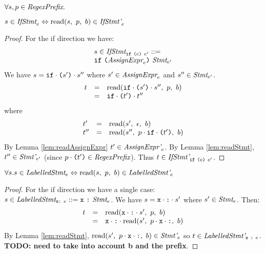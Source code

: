 \documentclass[preprint,10pt]{sigplanconf}
\begin{document}
\begin{lemma}\mbox{}
  
  \( \forall s, p \in \textit{RegexPrefix}. \)

  \( s \in \textit{IfStmt}_{e} \Leftrightarrow 
  \textrm{read}(s,~p,~b) \in \textit{IfStmt'}_{e} \)
\end{lemma}
\begin{proof}
  For the if direction we have:
  \[
  \begin{array}{lcl}
    s \in
    \textit{IfStmt}_{\texttt{if}~\texttt{(}e\texttt{)}~e'} 
    ::= 
    \\
    \texttt{if}~ \texttt{(}\textit{AssignExpr}_{e}\texttt{)}~
    \textit{Stmt}_{e'}
  \end{array}
  \]
  We have \( s = \texttt{if}\cdot \texttt{(}s'\texttt{)}\cdot s'' \) where \( s' \in
  \textit{AssignExpr}_{e} \) and \( s'' \in \textit{Stmt}_{e'} \).
  \[
  \begin{array}{rcl}
    t &=& \textrm{read}(
      \texttt{if}\cdot \texttt{(}s'\texttt{)}\cdot s'' 
    ,~p,~b)
    \\
    &=& \texttt{if} \cdot \texttt{(}t'\texttt{)} \cdot t'' 
  \end{array}
  \]
  where 
  \[ 
  \begin{array}{lcl}
    t' &=& \textrm{read}(s',~\epsilon,~b)
    \\
    t'' &=& \textrm{read}(s'',~
      p \cdot \texttt{if} \cdot \texttt{(}t'\texttt{)}
    ,~b)
  \end{array}
  \]
  By Lemma \ref{lem:readAssignExpr} \( t' \in
  \textit{AssignExpr'}_{e} \). By Lemma
  \ref{lem:readStmt}, \( t'' \in \textit{Stmt'}_{e'} \) (since
  \( p \cdot \texttt{(}t'\texttt{)} \in \textit{RegexPrefix} \)). Thus \( t \in
  \textit{IfStmt'}_{\texttt{if}~\texttt{(}e\texttt{)}~e'} \).
\end{proof}

\begin{lemma}\mbox{}
  
  \( \forall s. s \in \textit{LabelledStmt}_{e} \Leftrightarrow 
  \textrm{read}(s,~p,~b) \in \textit{LabelledStmt'}_{e} \)
\end{lemma}
\begin{proof}
  For the if direction we have a single case: \( s \in
  \textit{LabelledStmt}_{\texttt{x} \texttt{:}~e} ::=
  \texttt{x}~\texttt{:}~\textit{Stmt}_{e} \). We have \( s = \texttt{x} \cdot
  \texttt{:} \cdot s' \) where \( s' \in \textit{Stmt}_{e} \).
  Then:
  \[
  \begin{array}{rcl}
    t &=& \textrm{read}(\texttt{x} \cdot \texttt{:} \cdot s',~p,~b)
    \\
    &=& \texttt{x} \cdot \texttt{:} \cdot 
    \textrm{read}(s',~
      p \cdot \texttt{x} \cdot \texttt{:}
    ,~b)
  \end{array}
  \]
  By Lemma \ref{lem:readStmt}, \( \textrm{read}(s',~p \cdot \texttt{x} \cdot
    \texttt{:},~b) \in \textit{Stmt'}_{e} \) so \( t \in
  \textit{LabelledStmt'}_{\texttt{x}~\texttt{:}~e} \).
  \textbf{TODO: need to take into account b and the prefix}.
\end{proof}
\end{document}

